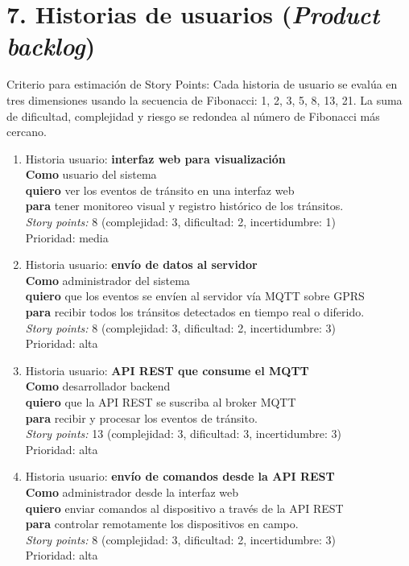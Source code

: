 \documentclass[
11pt, %
]{charter}
\begin{document}
\section{7. Historias de usuarios (\textit{Product backlog})}
\label{sec:backlog}
Criterio para estimación de Story Points: Cada historia de usuario se evalúa en tres
dimensiones usando la secuencia de Fibonacci: 1, 2, 3, 5, 8, 13, 21. La suma de dificultad,
complejidad y riesgo se redondea al número de Fibonacci más cercano.
\begin{enumerate}

\item Historia usuario: \textbf{interfaz web para visualización}\\
\textbf{Como} usuario del sistema\\
\textbf{quiero} ver los eventos de tránsito en una interfaz web\\
\textbf{para} tener monitoreo visual y registro histórico de los tránsitos.\\
\textit{Story points:} 8 (complejidad: 3, dificultad: 2, incertidumbre: 1)\\
Prioridad: media

\item  Historia usuario: \textbf{envío de datos al servidor}\\
\textbf{Como} administrador del sistema\\
\textbf{quiero} que los eventos se envíen al servidor vía MQTT sobre GPRS\\
\textbf{para} recibir todos los tránsitos detectados en tiempo real o diferido.\\
\textit{Story points:} 8 (complejidad: 3, dificultad: 2, incertidumbre: 3)\\
Prioridad: alta

\item  Historia usuario: \textbf{API REST que consume el MQTT}\\
\textbf{Como} desarrollador backend\\
\textbf{quiero} que la API REST se suscriba al broker MQTT\\
\textbf{para} recibir y procesar los eventos de tránsito.\\
\textit{Story points:} 13 (complejidad: 3, dificultad: 3, incertidumbre: 3)\\
Prioridad: alta

\item  Historia usuario: \textbf{envío de comandos desde la API REST}\\
\textbf{Como} administrador desde la interfaz web\\
\textbf{quiero} enviar comandos al dispositivo a través de la API REST\\
\textbf{para} controlar remotamente los dispositivos en campo.\\
\textit{Story points:} 8 (complejidad: 3, dificultad: 2, incertidumbre: 3)\\
Prioridad: alta


\end{enumerate}
\end{document}
